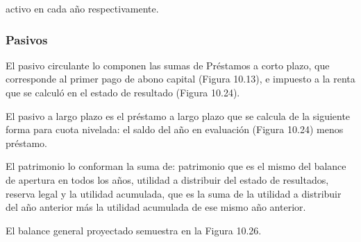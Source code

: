 activo en cada año respectivamente.

\subsubsection{Pasivos}

El pasivo circulante lo componen las sumas de Préstamos a corto plazo, que corresponde al primer pago de abono capital (Figura 10.13), e impuesto a la renta que se calculó en el estado de resultado (Figura 10.24).

El pasivo a largo plazo es el préstamo a largo plazo que se calcula de la siguiente forma para cuota nivelada: el saldo del año en evaluación (Figura 10.24) menos préstamo.

El patrimonio lo conforman la suma de: patrimonio que es el mismo del balance de apertura en todos los años, utilidad a distribuir del estado de resultados, reserva legal y la utilidad acumulada, que es la suma de la utilidad a distribuir del año anterior más la utilidad acumulada de ese mismo año anterior.

El balance general proyectado semuestra en la Figura 10.26.

